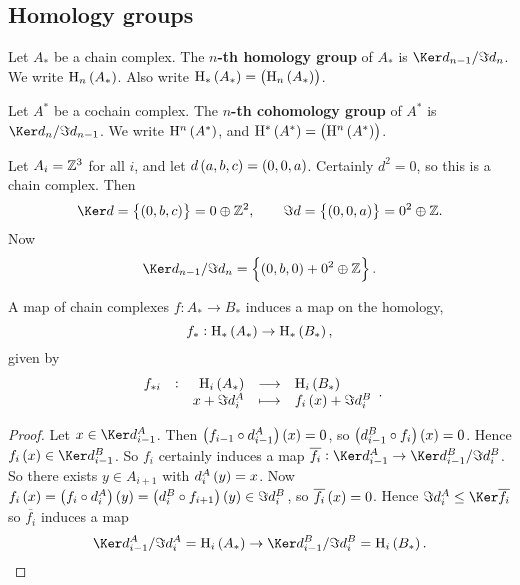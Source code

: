 \subsection{Homology groups}

\begin{definition}
Let $ A_* $ be a chain complex. The \textbf{$ n $-th homology group} of $ A_* $ is $ \Ker d_{n - 1} / \Im d_n $. We write $ \H_n\br{A_*} $. Also write $ \H_*\br{A_*} = \br{\H_n\br{A_*}} $.
\end{definition}

\begin{definition}
Let $ A^* $ be a cochain complex. The \textbf{$ n $-th cohomology group} of $ A^* $ is $ \Ker d_n / \Im d_{n - 1} $. We write $ \H^n\br{A^*} $, and $ \H^*\br{A^*} = \br{\H^n\br{A^*}} $.
\end{definition}

\begin{example*}
Let $ A_i = \mathbb{Z}^3 $ for all $ i $, and let $ d\br{a, b, c} = \br{0, 0, a} $. Certainly $ d^2 = 0 $, so this is a chain complex. Then
$$ \Ker d = \cbr{\br{0, b, c}} = 0 \oplus \ZZ^2, \qquad \Im d = \cbr{\br{0, 0, a}} = 0^2 \oplus \ZZ. $$
Now
$$ \Ker d_{n - 1} / \Im d_n = \cbr{\br{0, b, 0} + 0^2 \oplus \ZZ}. $$
\end{example*}

\begin{proposition}
A map of chain complexes $ f : A_* \to B_* $ induces a map on the homology,
$$ f_* : \H_*\br{A_*} \to \H_*\br{B_*}, $$
given by
$$ \function[f_{*i}]{\H_i\br{A_*}}{\H_i\br{B_*}}{x + \Im d_i^A}{f_i\br{x} + \Im d_i^B}. $$
\end{proposition}

\begin{proof}
Let $ x \in \Ker d_{i - 1}^A $. Then $ \br{f_{i - 1} \circ d_{i - 1}^A}\br{x} = 0 $, so $ \br{d_{i - 1}^B \circ f_i}\br{x} = 0 $. Hence $ f_i\br{x} \in \Ker d_{i - 1}^B $. So $ f_i $ certainly induces a map $ \overline{f_i} : \Ker d_{i - 1}^A \to \Ker d_{i - 1}^B / \Im d_i^B $. So there exists $ y \in A_{i + 1} $ with $ d_i^A\br{y} = x $. Now $ f_i\br{x} = \br{f_i \circ d_i^A}\br{y} = \br{d_i^B \circ f_{i + 1}}\br{y} \in \Im d_i^B $, so $ \overline{f_i}\br{x} = 0 $. Hence $ \Im d_i^A \le \Ker \overline{f_i} $ so $ \overline{f_i} $ induces a map
$$ \Ker d_{i - 1}^A / \Im d_i^A = \H_i\br{A_*} \to \Ker d_{i - 1}^B / \Im d_i^B = \H_i\br{B_*}. $$
\end{proof}

\pagebreak

